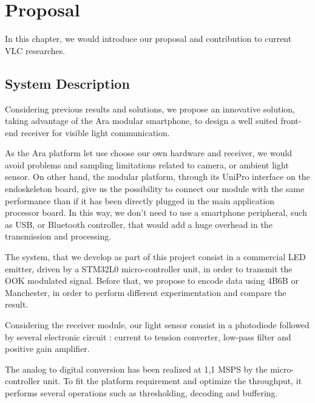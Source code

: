 
\chapter{Proposal} %

\label{Proposal} %


In this chapter, we would introduce our proposal and contribution to current VLC researches. 


\section{System Description}


Considering previous results and solutions, we propose an innovative solution, taking advantage of the Ara modular smartphone,
to design a well suited front-end receiver for visible light communication.

As the Ara platform let use choose our own hardware and receiver, we would avoid problems and sampling limitations related to camera, or ambient light sensor.
On other hand, the modular platform, through its UniPro interface on the endoskeleton board, give us the possibility to connect our module with the same performance than if it has been directly plugged in the main application processor board.
In this way, we don't need to use a smartphone peripheral, such as USB, or Bluetooth controller, that would add a huge overhead in the transmission and processing.

The system, that we develop as part of this project consist in a commercial LED emitter, driven by a STM32L0 micro-controller unit, in order to transmit the OOK modulated signal. Before that, we propose to encode data using 4B6B or Manchester, in order to perform different experimentation and compare the result.

Considering the receiver module, our light sensor consist in a photodiode followed by several electronic circuit : current to tension converter, low-pass filter and positive gain amplifier.

The analog to digital conversion has been realized at 1,1 MSPS by the micro-controller unit. To fit the platform requirement and optimize the throughput, it performs several operations such as thresholding, decoding and buffering.

